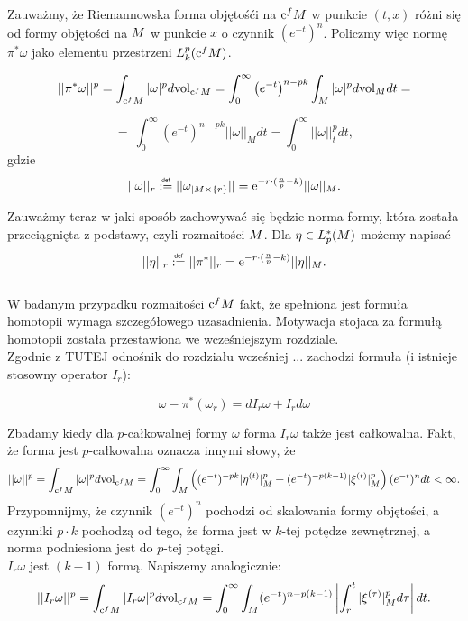 \documentclass[licencjacka]{pracamgr}
\theoremstyle{definition}
\theoremstyle{definition}
\theoremstyle{plain}
\theoremstyle{plain}
\theoremstyle{plain}
\theoremstyle{plain}
\def\cfm{\ensuremath\mathrm{c}^fM}
\def\M{\ensuremath M}
\newcommand\deff{\mathrel{\overset{\makebox[0pt]{\mbox{\normalfont\tiny\sffamily def}}}{:=}}}
\begin{document}
Zauważmy, że Riemannowska forma objętośći na $\cfm$ w punkcie $(t,x)$ różni się
od formy objętości na $\M$ w punkcie $x$ o czynnik $(e^{-t})^n$.  Policzmy więc
normę $\pi^\ast \omega$ jako elementu przestrzeni $L_k^p (\cfm)$.

\[
    ||\pi^\ast \omega ||^p = \int_{\cfm} |\omega |^p d \mathrm{vol}_{\cfm} =
    \int_0^\infty \left( e^{-t} \right)^{n-pk} \int_M |\omega|^p d
    \mathrm{vol}_M dt = 
\]

\[
    = \
    \int_0^\infty \left( e^{-t} \right)^{n-pk} || \omega ||_{M} dt = 
    \int_0^\infty || \omega ||_t^p dt,
\] 
gdzie
\[
|| \omega ||_r \deff || \omega_{|M \times \{r\} } || =
\mathrm{e}^{-r \cdot (\frac{n}{p} - k) }  ||\omega ||_{\M}.
\]

Zauważmy teraz w jaki sposób zachowywać się będzie norma formy, która
została przeciągnięta z podstawy, czyli rozmaitości $\M$. Dla 
$\eta \in L_p^\ast (\M)$ możemy napisać
\[
    || \eta ||_r \deff || \pi^\ast ||_r = 
\mathrm{e}^{-r \cdot (\frac{n}{p} - k) }  ||\eta ||_{\M}.
\] \\

W badanym przypadku rozmaitości $\cfm$ fakt, że spełniona jest formuła homotopii
wymaga szczegółowego uzasadnienia. Motywacja stojaca za formułą homotopii
została przestawiona we wcześniejszym rozdziale.\\

Zgodnie z 
TUTEJ odnośnik do 
rozdziału wcześniej ... zachodzi formuła (i istnieje stosowny operator 
$I_r$):

\[
    \omega - \pi^\ast(\omega_r) = dI_r \omega + I_r d\omega
\]


Zbadamy kiedy dla $p$-całkowalnej formy $\omega$ forma $I_r \omega$
także jest całkowalna. Fakt, że forma jest  $p$-całkowalna oznacza innymi słowy, że
\[
    || \omega ||^p = \int_{\cfm} |\omega|^p d \text{vol}_{\cfm} =
    \int_0^\infty \int_{\M} \left(
        (e^{-t})^{-pk} | \eta^{(t)}|^p_{\M} + 
        (e^{-t})^{-p(k-1)} | \xi^{(t)}|^p_{\M} 
    \right)
    (e^{-t})^{n} dt < \infty.
\]
Przypomnijmy, że czynnik $ (e^{-t})^{n} $ pochodzi od skalowania formy objętości, a
czynniki $p \cdot k$ pochodzą od tego, że forma jest w $k$-tej potędze zewnętrznej,
a norma podniesiona jest do $p$-tej potęgi. \\


$I_r \omega$ jest $(k-1)$ formą. Napiszemy analogicznie:
\[
    ||I_r \omega ||^p = 
    \int_{\cfm} |I_r \omega|^p  d\text{vol}_{\cfm} =
    \int_0^\infty \int_{\M} 
        (e^{-t})^{n-p(k-1)}
      \left| \int_r^t |\xi^{(\tau)} |^p_{\M} d\tau \right| dt.
\] \\
\end{document}

